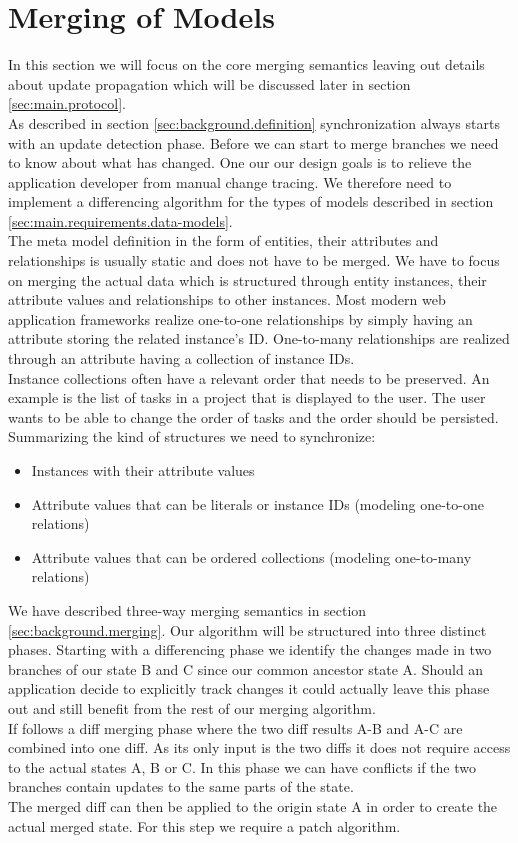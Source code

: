\section{Merging of Models}
In this section we will focus on the core merging semantics leaving out details about update propagation which will be discussed later in section \ref{sec:main.protocol}.\\
As described in section \ref{sec:background.definition} synchronization always starts with an update detection phase.
Before we can start to merge branches we need to know about what has changed.
One our our design goals is to relieve the application developer from manual change tracing.
We therefore need to implement a differencing algorithm for the types of models described in section \ref{sec:main.requirements.data-models}.\\
The meta model definition in the form of entities, their attributes and relationships is usually static and does not have to be merged.
We have to focus on merging the actual data which is structured through entity instances, their attribute values and relationships to other instances.
Most modern web application frameworks realize one-to-one relationships by simply having an attribute storing the related instance's ID.
One-to-many relationships are realized through an attribute having a collection of 
instance IDs.\\
Instance collections often have a relevant order that needs to be preserved.
An example is the list of tasks in a project that is displayed to the user.
The user wants to be able to change the order of tasks and the order should be persisted.\\
Summarizing the kind of structures we need to synchronize:

\begin{itemize}
\item Instances with their attribute values
\item Attribute values that can be literals or instance IDs (modeling one-to-one relations)
\item Attribute values that can be ordered collections (modeling one-to-many relations)
\end{itemize}

We have described three-way merging semantics in section \ref{sec:background.merging}.
Our algorithm will be structured into three distinct phases.
Starting with a differencing phase we identify the changes made in two branches of our state B and C since our common ancestor state A.
Should an application decide to explicitly track changes it could actually leave this phase out and still benefit from the rest of our merging algorithm.\\
If follows a diff merging phase where the two diff results A-B and A-C are combined into one diff.
As its only input is the two diffs it does not require access to the actual states A, B or C.
In this phase we can have conflicts if the two branches contain updates to the same parts of the state.\\
The merged diff can then be applied to the origin state A in order to create the actual merged state.
For this step we require a patch algorithm.

